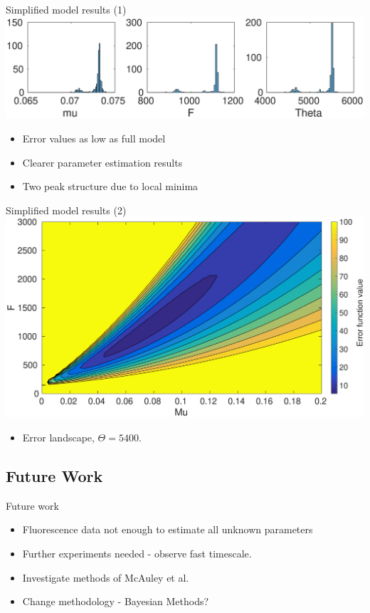 \documentclass{beamer}
\begin{document}
\begin{frame}{Simplified model results (1)}
  \includegraphics[scale = 0.29, clip = true, trim = 100 0 0 400]{Figures/13_9_hist_simplified}
  \begin{itemize}
\item  Error values as low as full model
\item Clearer parameter estimation results
\item Two peak structure due to local minima
\end{itemize}
\end{frame}

\begin{frame}{Simplified model results (2)}
  \includegraphics[scale = 0.26, clip = true, trim = 40 0 0 0]{Figures/Likelihood_rough_presentation}
    \begin{itemize}
\item  Error landscape, $\Theta = 5400$.
\end{itemize}
\end{frame}

\subsection{Future Work}


\begin{frame}{Future work}
  \begin{itemize}
  \item Fluorescence data \alert {not enough} to estimate all unknown parameters 
  \item Further experiments needed - observe fast timescale.
  \item Investigate methods of McAuley et al. 
  \item Change methodology - Bayesian Methods?
  \end{itemize}
  \end{frame}
  
\end{document}
